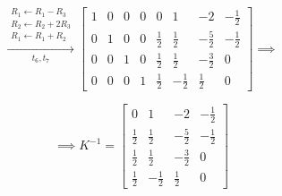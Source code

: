 \begin{enumerate}[label=\alph*)]
\begin{answer}
    $$
    \xrightarrow[t_6,t_7]{
        \substack{
            R_1\leftarrow R_1-R_3\\
            R_2\leftarrow R_2+2R_3\\
            R_1\leftarrow R_1+R_2
        }
    }
    \left[
    \begin{array}{rrrr|rrrr}
        1 & 0 & 0 & 0 & 0 & 1 & -2 & -\frac12\\
        0 & 1 & 0 & 0 & \frac12 & \frac12 & -\frac52 & -\frac12\\
        0 & 0 & 1 & 0 & \frac12 & \frac12 & -\frac32 & 0\\
        0 & 0 & 0 & 1 & \frac12 & -\frac12 & \frac12 & 0
    \end{array}
    \right]
    \implies
    $$

    $$
    \implies
    \boxed{
    K^{-1}=
    \begin{bmatrix}
        0 & 1 & -2 & -\frac12\\
        \frac12 & \frac12 & -\frac52 & -\frac12\\
        \frac12 & \frac12 & -\frac32 & 0\\
        \frac12 & -\frac12 & \frac12 & 0
    \end{bmatrix}
    }
    $$
\end{answer}

\end{enumerate}
